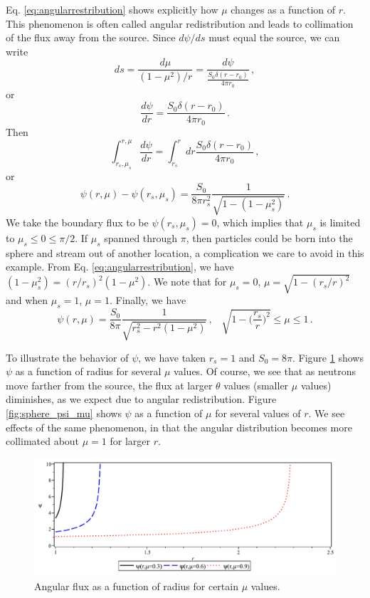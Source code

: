 Eq. \ref{eq:angularrestribution} shows explicitly how $\mu$ changes as a function of $r$.  This phenomenon is often called angular redistribution and leads to collimation of the flux away from the source.  Since $d\psi/ds$ must equal the source, we can write
\begin{equation}
 ds = \frac{d\mu}{ (1-\mu^2)/r } = \frac{d\psi}{ \frac{S_0\delta(r-r_0)}{4\pi r_0}  } \, ,
\end{equation}
or 
\begin{equation}
\frac{d\psi}{dr} = \frac{S_0\delta(r-r_0)}{4\pi r_0} \, .
\end{equation}
Then
\begin{equation}
 \int^{r,\mu}_{r_s,\mu_s} \frac{d\psi}{dr}  = \int^r_{r_s} dr \frac{S_0\delta(r-r_0)}{4\pi r_0} \, ,
\end{equation}
or
\begin{equation}
 \psi(r,\mu)-\psi(r_s,\mu_s) = \frac{S_0}{8\pi r^2_s} \frac{1}{\sqrt{1-(1-\mu^2_s)}} \, .
\end{equation}
We take the boundary flux to be $\psi(r_s,\mu_s) = 0$, which implies that $\mu_s$ is limited to $\mu_s \leq 0 \leq \pi/2$. If $\mu_s$ spanned through $\pi$, then particles could be born into the sphere and stream out of another location, a complication we care to avoid in this example.  From Eq. \ref{eq:angularrestribution}, we have $(1-\mu^2_s)=(r/r_s)^2(1-\mu^2)$.  We note that for $\mu_s = 0$, $\mu=\sqrt{1-(r_s/r)^2}$ and when $\mu_s=1$, $\mu=1$.  Finally, we have
\begin{equation}
 \psi(r,\mu) = \frac{S_0}{8\pi} \frac{1}{\sqrt{r^2_s - r^2(1-\mu^2)}} \, , \, \, \, \, \, \sqrt{1-\Big ( \frac{r_s}{r} \Big )^2 } \leq \mu \leq 1 \, .
 \label{eq:spherepsi}
\end{equation}

To illustrate the behavior of $\psi$, we have taken $r_s = 1$ and $S_0 = 8\pi$.  Figure \ref{fig:sphere_psi_radius} shows $\psi$ as a function of radius for several $\mu$ values.  Of course, we see that as neutrons move farther from the source, the flux at larger $\theta$ values (smaller $\mu$ values) diminishes, as we expect due to angular redistribution. Figure \ref{fig:sphere_psi_mu} shows $\psi$ as a function of $\mu$ for several values of $r$.  We see effects of the same phenomenon, in that the angular distribution becomes more collimated about $\mu = 1$ for larger $r$.
\begin{figure}[ht] 
    \centering
    \includegraphics[keepaspectratio, width = 5.0 in]{images/sphere_psi_radius}
    \caption{Angular flux as a function of radius for certain $\mu$ values.}
    \label{fig:sphere_psi_radius}
\end{figure}

